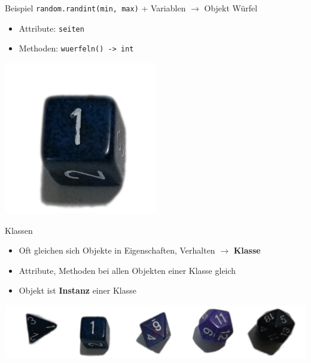 \begin{frame}{Beispiel}
    \texttt{random.randint(min, max)} + Variablen $\rightarrow$ Objekt \glqq Würfel\grqq \begin{itemize}
        \item Attribute: \texttt{seiten}
        \item Methoden: \texttt{wuerfeln() -> int}
    \end{itemize}
    \begin{center}
        \includegraphics[width=0.5\textwidth]{../images/d6.jpg}
    \end{center}
\end{frame}
\begin{frame}{Klassen}
    \begin{itemize}
        \item Oft gleichen sich Objekte in Eigenschaften, Verhalten $\rightarrow$ \textbf{Klasse}
        \item Attribute, Methoden bei allen Objekten einer Klasse gleich
        \item Objekt ist \textbf{Instanz} einer Klasse
    \end{itemize}
    \includegraphics[width=\textwidth]{../images/dice.jpg}
\end{frame}


